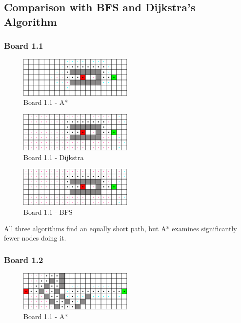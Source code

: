 \newpage

\subsection*{Comparison with BFS and Dijkstra's Algorithm}

\subsubsection*{Board 1.1}

\begin{figure}[h!]
  \centering
    \includegraphics[width=0.5\textwidth]{img/board-1-1-astar}
    \caption{Board 1.1 - A*}
\end{figure}

\begin{figure}[h!]
  \centering
    \includegraphics[width=0.5\textwidth]{img/board-1-1-dijkstra}
    \caption{Board 1.1 - Dijkstra}
\end{figure}

\begin{figure}[h!]
  \centering
    \includegraphics[width=0.5\textwidth]{img/board-1-1-bfs}
    \caption{Board 1.1 - BFS}
\end{figure}

All three algorithms find an equally short path, but A* examines significantly
fewer nodes doing it.

\newpage

\subsubsection*{Board 1.2}

\begin{figure}[h!]
  \centering
    \includegraphics[width=0.5\textwidth]{img/board-1-2-astar}
    \caption{Board 1.1 - A*}
\end{figure}

